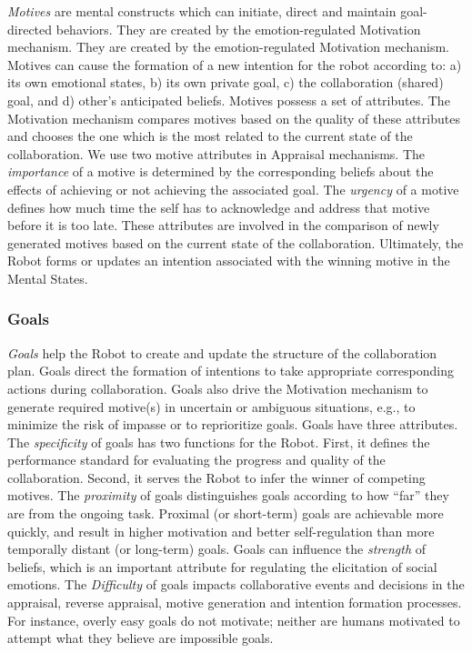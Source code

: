 \textit{Motives} are mental constructs which can initiate, direct and maintain
goal-directed behaviors. They are created by the emotion-regulated Motivation
mechanism. They are created by the emotion-regulated Motivation mechanism.
Motives can cause the formation of a new intention for the robot according to:
a) its own emotional states, b) its own private goal, c) the collaboration
(shared) goal, and d) other's anticipated beliefs. Motives possess a set of
attributes. The Motivation mechanism compares motives based on the quality of
these attributes and chooses the one which is the most related to the current
state of the collaboration. We use two motive attributes in Appraisal
mechanisms. The \textit{importance} of a motive is determined by the
corresponding beliefs about the effects of achieving or not achieving the
associated goal. The \textit{urgency} of a motive defines how much time the self
has to acknowledge and address that motive before it is too late. These
attributes are involved in the comparison of newly generated motives based on
the current state of the collaboration. Ultimately, the Robot forms or updates
an intention associated with the winning motive in the Mental States.

\subsubsection{Goals}
\label{sec:goals}

\textit{Goals} help the Robot to create and update the structure of the
collaboration plan. Goals direct the formation of intentions to take appropriate
corresponding actions during collaboration. Goals also drive the Motivation
mechanism to generate required motive(s) in uncertain or ambiguous situations,
e.g., to minimize the risk of impasse or to reprioritize goals. Goals have
three attributes. The \textit{specificity} of goals has two functions for the
Robot. First, it defines the performance standard for evaluating the progress
and quality of the collaboration. Second, it serves the Robot to infer the
winner of competing motives. The \textit{proximity} of goals distinguishes goals
according to how ``far'' they are from the ongoing task. Proximal (or
short-term) goals are achievable more quickly, and result in higher motivation
and better self-regulation than more temporally distant (or long-term) goals.
Goals can influence the \textit{strength} of beliefs, which is an important
attribute for regulating the elicitation of social emotions. The
\textit{Difficulty} of goals impacts collaborative events and decisions in the
appraisal, reverse appraisal, motive generation and intention formation
processes. For instance, overly easy goals do not motivate; neither are humans
motivated to attempt what they believe are impossible goals.


